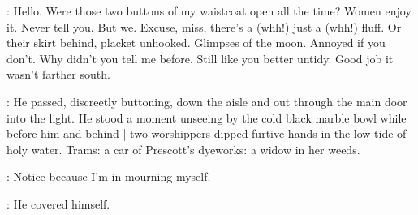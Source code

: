 \BloomInt:
Hello.
Were those two buttons of my waistcoat open all the time?
Women enjoy it.
Never tell you.
But we.
Excuse, miss, there's a (whh!)
just a (whh!) fluff.
Or their skirt behind, placket unhooked.
Glimpses of the moon.
Annoyed if you don't.
Why didn't you tell me before.
Still like you better untidy.
Good job it wasn't farther south.

:
He passed, discreetly buttoning,
down the aisle and out through the main door into the light.
He stood a moment unseeing
by the cold black marble bowl
while before him and behind |
two worshippers dipped furtive hands in the low tide of holy water.
Trams:
a car of Prescott's dyeworks:
a widow in her weeds.

\BloomInt:
Notice because I'm in mourning myself.

:
He covered himself.
